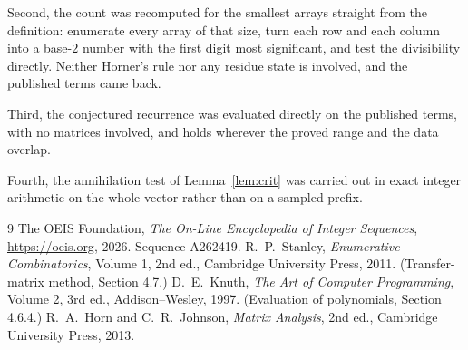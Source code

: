 \documentclass[11pt,a4paper]{article}
\theoremstyle{plain}
\theoremstyle{definition}
\begin{document}
Second, the count was recomputed for the smallest arrays straight from the definition:
enumerate every array of that size, turn each row and each column into a base-$2$ number with
the first digit most significant, and test the divisibility directly. Neither Horner's rule nor
any residue state is involved, and the published terms came back.

Third, the conjectured recurrence was evaluated directly on the published terms, with no
matrices involved, and holds wherever the proved range and the data overlap.

Fourth, the annihilation test of Lemma~\ref{lem:crit} was carried out in exact integer
arithmetic on the whole vector rather than on a sampled prefix.

\begin{thebibliography}{9}
 The OEIS Foundation, \emph{The On-Line Encyclopedia of Integer
Sequences}, \url{https://oeis.org}, 2026. Sequence A262419.
 R.~P.~Stanley, \emph{Enumerative Combinatorics}, Volume 1, 2nd ed.,
Cambridge University Press, 2011. (Transfer-matrix method, Section 4.7.)
 D.~E.~Knuth, \emph{The Art of Computer Programming}, Volume 2, 3rd ed.,
Addison--Wesley, 1997. (Evaluation of polynomials, Section 4.6.4.)
 R.~A.~Horn and C.~R.~Johnson, \emph{Matrix Analysis}, 2nd ed., Cambridge
University Press, 2013.
\end{thebibliography}
\end{document}
